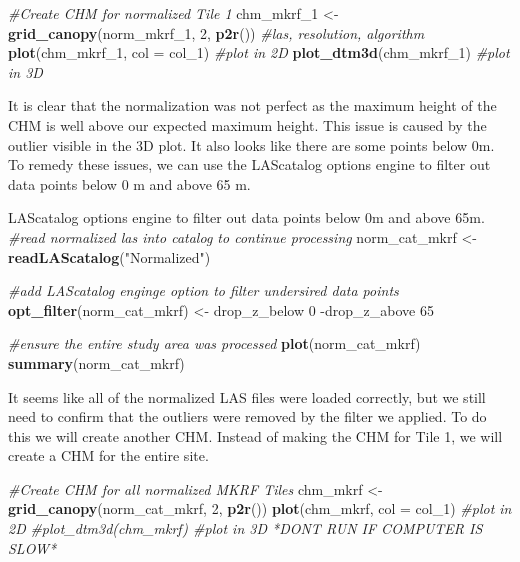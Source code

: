 \documentclass[
]{book}
\newenvironment{Shaded}{\begin{snugshade}}{\end{snugshade}}
\newcommand{\AttributeTok}[1]{\textcolor[rgb]{0.13,0.29,0.53}{#1}}
\newcommand{\CommentTok}[1]{\textcolor[rgb]{0.56,0.35,0.01}{\textit{#1}}}
\newcommand{\DecValTok}[1]{\textcolor[rgb]{0.00,0.00,0.81}{#1}}
\newcommand{\FunctionTok}[1]{\textcolor[rgb]{0.13,0.29,0.53}{\textbf{#1}}}
\newcommand{\NormalTok}[1]{#1}
\newcommand{\OtherTok}[1]{\textcolor[rgb]{0.56,0.35,0.01}{#1}}
\newcommand{\StringTok}[1]{\textcolor[rgb]{0.31,0.60,0.02}{#1}}
\begin{document}
\begin{Shaded}
\begin{Highlighting}[]
\CommentTok{\#Create CHM for normalized Tile 1}
\NormalTok{chm\_mkrf\_1 }\OtherTok{\textless{}{-}} \FunctionTok{grid\_canopy}\NormalTok{(norm\_mkrf\_1, }\DecValTok{2}\NormalTok{, }\FunctionTok{p2r}\NormalTok{()) }\CommentTok{\#las, resolution, algorithm}
\FunctionTok{plot}\NormalTok{(chm\_mkrf\_1, }\AttributeTok{col =}\NormalTok{ col\_1) }\CommentTok{\#plot in 2D}
\FunctionTok{plot\_dtm3d}\NormalTok{(chm\_mkrf\_1) }\CommentTok{\#plot in 3D}
\end{Highlighting}
\end{Shaded}

It is clear that the normalization was not perfect as the maximum height of the CHM is well above our expected maximum height. This issue is caused by the outlier visible in the 3D plot. It also looks like there are some points below 0m. To remedy these issues, we can use the LAScatalog options engine to filter out data points below 0 m and above 65 m.

\begin{Shaded}
\begin{Highlighting}[]
\NormalTok{LAScatalog options engine to filter out data points below 0m and above 65m.}
\CommentTok{\#read normalized las into catalog to continue processing}
\NormalTok{norm\_cat\_mkrf }\OtherTok{\textless{}{-}} \FunctionTok{readLAScatalog}\NormalTok{(}\StringTok{"Normalized"}\NormalTok{)}

\CommentTok{\#add LAScatalog enginge option to filter undersired data points}
\FunctionTok{opt\_filter}\NormalTok{(norm\_cat\_mkrf) }\OtherTok{\textless{}{-}} \StringTok{\textquotesingle{}{-}drop\_z\_below 0 {-}drop\_z\_above 65\textquotesingle{}}

\CommentTok{\#ensure the entire study area was processed}
\FunctionTok{plot}\NormalTok{(norm\_cat\_mkrf)}
\FunctionTok{summary}\NormalTok{(norm\_cat\_mkrf)}
\end{Highlighting}
\end{Shaded}

It seems like all of the normalized LAS files were loaded correctly, but we still need to confirm that the outliers were removed by the filter we applied. To do this we will create another CHM. Instead of making the CHM for Tile 1, we will create a CHM for the entire site.

\begin{Shaded}
\begin{Highlighting}[]
\CommentTok{\#Create CHM for all normalized MKRF Tiles}
\NormalTok{chm\_mkrf }\OtherTok{\textless{}{-}} \FunctionTok{grid\_canopy}\NormalTok{(norm\_cat\_mkrf, }\DecValTok{2}\NormalTok{, }\FunctionTok{p2r}\NormalTok{()) }
\FunctionTok{plot}\NormalTok{(chm\_mkrf, }\AttributeTok{col =}\NormalTok{ col\_1) }\CommentTok{\#plot in 2D}
\CommentTok{\#plot\_dtm3d(chm\_mkrf) \#plot in 3D *DON\textquotesingle{}T RUN IF COMPUTER IS SLOW*}
\end{Highlighting}
\end{Shaded}
\end{document}
